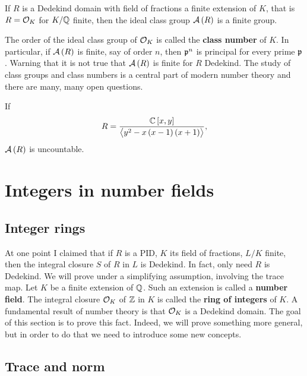 \begin{theorem}
If $ R $ is a Dedekind domain with field of fractions a finite extension of $ K $, that is $ R = \mathcal{O}_K $ for $ K / \mathbb{Q} $ finite, then the ideal class group $ \AA\br{R} $ is a finite group.
\end{theorem}

The order of the ideal class group of $ \mathcal{O}_K $ is called the \textbf{class number} of $ K $. In particular, if $ \AA\br{R} $ is finite, say of order $ n $, then $ \mathfrak{p}^n $ is principal for every prime $ \mathfrak{p} $. Warning that it is not true that $ \AA\br{R} $ is finite for $ R $ Dedekind. The study of class groups and class numbers is a central part of modern number theory and there are many, many open questions.

\begin{example*}
If
$$ R = \dfrac{\C\sbr{x, y}}{\abr{y^2 - x\br{x - 1}\br{x + 1}}}, $$
$ \AA\br{R} $ is uncountable.
\end{example*}

\pagebreak

\section{Integers in number fields}

\subsection{Integer rings}

At one point I claimed that if $ R $ is a PID, $ K $ its field of fractions, $ L / K $ finite, then the integral closure $ S $ of $ R $ in $ L $ is Dedekind. In fact, only need $ R $ is Dedekind. We will prove under a simplifying assumption, involving the trace map. Let $ K $ be a finite extension of $ \mathbb{Q} $. Such an extension is called a \textbf{number field}. The integral closure $ \mathcal{O}_K $ of $ \mathbb{Z} $ in $ K $ is called the \textbf{ring of integers} of $ K $. A fundamental result of number theory is that $ \mathcal{O}_K $ is a Dedekind domain. The goal of this section is to prove this fact. Indeed, we will prove something more general, but in order to do that we need to introduce some new concepts.

\subsection{Trace and norm}

